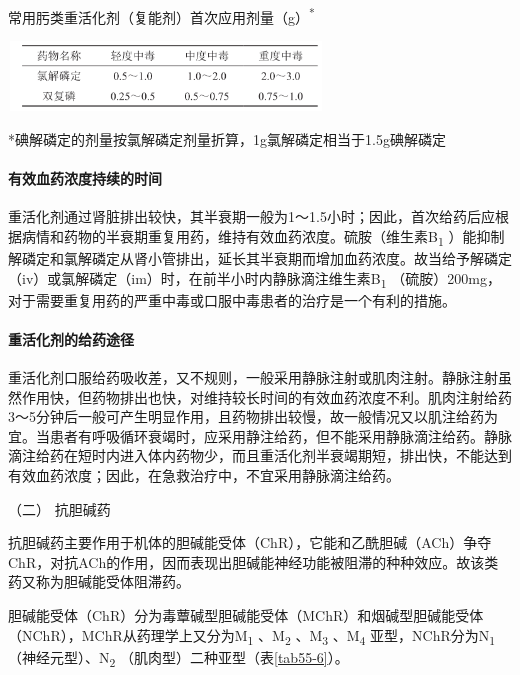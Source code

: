 \begin{table}[htbp]
\centering
\caption{常用肟类重活化剂（复能剂）首次应用剂量（g）\textsuperscript{*}}
\label{tab55-5}
\includegraphics[width=3.29167in,height=0.72917in]{./images/Image00207.jpg}
\end{table}

*碘解磷定的剂量按氯解磷定剂量折算，1g氯解磷定相当于1.5g碘解磷定

\paragraph{有效血药浓度持续的时间}

重活化剂通过肾脏排出较快，其半衰期一般为1～1.5小时；因此，首次给药后应根据病情和药物的半衰期重复用药，维持有效血药浓度。硫胺（维生素B\textsubscript{1}
）能抑制解磷定和氯解磷定从肾小管排出，延长其半衰期而增加血药浓度。故当给予解磷定（iv）或氯解磷定（im）时，在前半小时内静脉滴注维生素B\textsubscript{1}
（硫胺）200mg，对于需要重复用药的严重中毒或口服中毒患者的治疗是一个有利的措施。

\paragraph{重活化剂的给药途径}

重活化剂口服给药吸收差，又不规则，一般采用静脉注射或肌肉注射。静脉注射虽然作用快，但药物排出也快，对维持较长时间的有效血药浓度不利。肌肉注射给药3～5分钟后一般可产生明显作用，且药物排出较慢，故一般情况又以肌注给药为宜。当患者有呼吸循环衰竭时，应采用静注给药，但不能采用静脉滴注给药。静脉滴注给药在短时内进入体内药物少，而且重活化剂半衰竭期短，排出快，不能达到有效血药浓度；因此，在急救治疗中，不宜采用静脉滴注给药。

\hypertarget{text00139.htmlux5cux23CHP5-3-1-3-2-2}{}
（二） 抗胆碱药

抗胆碱药主要作用于机体的胆碱能受体（ChR），它能和乙酰胆碱（ACh）争夺ChR，对抗ACh的作用，因而表现出胆碱能神经功能被阻滞的种种效应。故该类药又称为胆碱能受体阻滞药。

胆碱能受体（ChR）分为毒蕈碱型胆碱能受体（MChR）和烟碱型胆碱能受体（NChR），MChR从药理学上又分为M\textsubscript{1}
、M\textsubscript{2} 、M\textsubscript{3} 、M\textsubscript{4}
亚型，NChR分为N\textsubscript{1} （神经元型）、N\textsubscript{2}
（肌肉型）二种亚型（表\ref{tab55-6}）。

